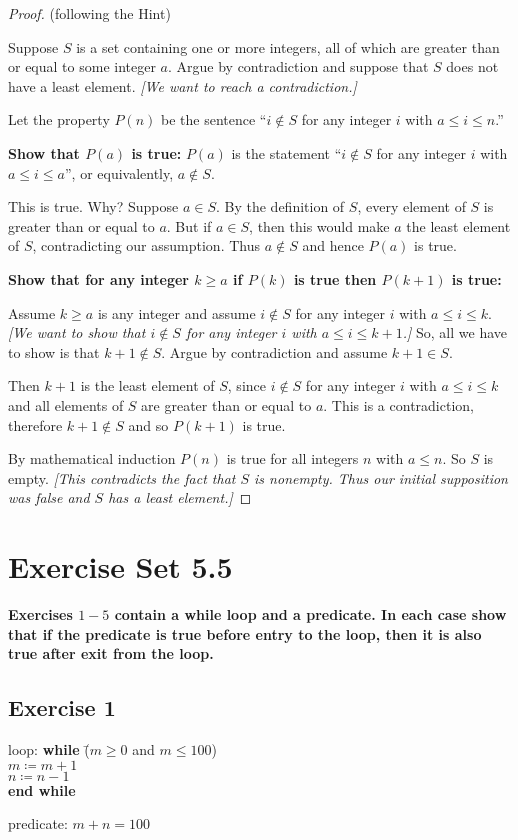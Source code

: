 \documentclass[14pt]{extarticle}
\newcommand{\cy}{\color{cyan}}
\begin{document}
\begin{proof}
    (following the Hint)

    Suppose $S$ is a set containing one or more integers, all of which are greater than or equal to some integer $a$.
    Argue by contradiction and suppose that $S$ does not have a least element. {\it [We want to reach a contradiction.]}

    Let the property $P(n)$ be the sentence ``$i \notin S$ for any integer $i$ with $a \leq i \leq n$.''

    {\bf Show that $P(a)$ is true:} $P(a)$ is the statement
    ``$i \notin S$ for any integer $i$ with $a \leq i \leq a$'', or equivalently, $a \notin S$.

    This is true. Why? Suppose $a \in S$. By the definition of $S$, every element of $S$ is greater than or equal to $a$.
    But if $a \in S$, then this would make $a$ the least element of $S$, contradicting our assumption.
    Thus $a \notin S$ and hence $P(a)$ is true.

        {\bf Show that for any integer $k \geq a$ if $P(k)$ is true then $P(k+1)$ is true:}

    Assume $k \geq a$ is any integer and assume $i \notin S$ for any integer $i$ with $a \leq i \leq k$.
        {\it [We want to show that $i \notin S$ for any integer $i$ with $a \leq i \leq k+1$.]}
    So, all we have to show is that $k+1 \notin S$. Argue by contradiction and assume $k+1 \in S$.

    Then $k+1$ is the least element of $S$, since $i \notin S$ for any integer $i$ with $a \leq i \leq k$ and all elements
    of $S$ are greater than or equal to $a$. This is a contradiction, therefore $k+1 \notin S$ and so $P(k+1)$ is true.

    By mathematical induction $P(n)$ is true for all integers $n$ with $a \leq n$. So $S$ is empty.
        {\it [This contradicts the fact that $S$ is nonempty. Thus our initial supposition was false and $S$ has a least element.]}
\end{proof}

\section{Exercise Set 5.5}

 {\bf \cy Exercises $1-5$ contain a while loop and a predicate. In each case show that if the predicate is true
  before entry to the loop, then it is also true after exit from the loop.}

\subsection{Exercise 1}
\begin{tabbing}
    loop: \hspace{1cm}
    \= {\bf while} \= ($m \geq 0$ and $m \leq 100$) \\
    \>             \> $m \coloneqq m + 1$ \\
    \>             \> $n \coloneqq n - 1$ \\
    \> {\bf end while}
\end{tabbing}
predicate: $m + n = 100$
\end{document}
